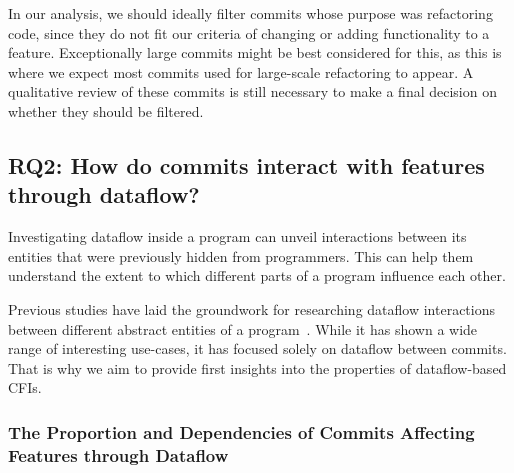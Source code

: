 In our analysis, we should ideally filter commits whose purpose was refactoring code, since they do not fit our criteria of changing or adding functionality to a feature.
Exceptionally large commits might be best considered for this, as this is where we expect most commits used for large-scale refactoring to appear.
A qualitative review of these commits is still necessary to make a final decision on whether they should be filtered.

\subsection[RQ2: How do commits interact with features through dataflow?]{\textbf{RQ2}: How do commits interact with features through dataflow?}\label{sec:meth:RQ2}

Investigating dataflow inside a program can unveil interactions between its entities that were previously hidden from programmers.
This can help them understand the extent to which different parts of a program influence each other.

Previous studies have laid the groundwork for researching dataflow interactions between different abstract entities of a program~\cite{sattler2023seal}.
While it has shown a wide range of interesting use-cases, it has focused solely on dataflow between commits.
That is why we aim to provide first insights into the properties of dataflow-based CFIs.

\subsubsection*{The Proportion and Dependencies of Commits Affecting Features through Dataflow}

